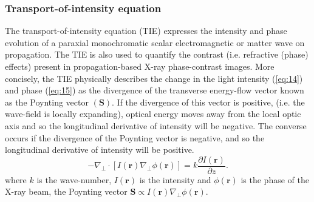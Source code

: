 \documentclass[10pt, a4paper, singlespacing]{report}
\begin{document}
\subsubsection{Transport-of-intensity equation}\label{TIE}
The transport-of-intensity equation (TIE) expresses the intensity and phase evolution of a paraxial monochromatic scalar electromagnetic or matter wave on propagation\cite{Pags2002}. The TIE is also used to quantify the contrast (i.e. refractive (phase) effects) present in propagation-based X-ray phase-contrast images\cite{PagsTutes}.
More concisely, the TIE physically describes the change in the light intensity (\ref{eq:14}) and phase (\ref{eq:15}) as the divergence of the transverse energy-flow vector known as the Poynting vector $(\textbf{S})$. If the divergence of this vector is positive, (i.e. the wave-field is locally expanding), optical energy moves away from the local optic axis and so the longitudinal derivative of
intensity will be negative. The converse occurs if the divergence of the Poynting vector is negative, and so the longitudinal derivative of intensity will be positive\cite{PagsTutes}.
\begin{equation}\label{eq:16}
-\nabla_{\perp} \cdot [I(\mathbf{r}) \nabla_{\perp} \phi(\mathbf{r})] = k \frac{\partial I (\mathbf{r})}{\partial z}.
\end{equation}
where $k$ is the wave-number, $I(\mathbf{r})$ is the intensity and $\phi(\mathbf{r})$ is the phase of the X-ray beam, the Poynting vector $\textbf{S} \propto I(\mathbf{r}) \nabla_{\perp} \phi(\mathbf{r})$.

\end{document}
